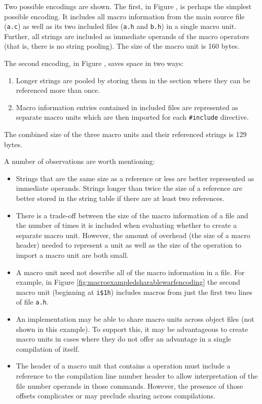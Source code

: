 Two possible encodings are shown. The first, in 
Figure , is perhaps the simplest
possible encoding. It includes all macro information from the
main source file (\texttt{a.c}) as well as its two included files
(\texttt{a.h} and \texttt{b.h}) in a single macro unit. Further,
all strings are included as immediate operands of the macro
operators (that is, there is no string pooling). The size
of the macro unit is 160 bytes.

The second encoding, in 
Figure ,
saves space in two ways:
\begin{enumerate}[1. ]
\item Longer strings are pooled by storing them in the
\dotdebugstr{} section where they can be referenced more than
once.

\item Macro information entries contained in included files
are represented as separate macro units which are then
imported for each \texttt{\#include} directive.

\end{enumerate}
The combined size of the three macro units and their referenced
strings is 129 bytes.

A number of observations are worth mentioning:
\begin{itemize}
\item
Strings that are the same size as a reference or less are
better represented as immediate operands. Strings longer
than twice the size of a reference are better stored in the
string table if there are at least two references.

\item
There is a trade-off between the size of the macro information
of a file and the number of times it is included when evaluating
whether to create a separate macro unit. However, the amount
of overhead (the size of a macro header) needed to represent a
unit as well as the size of the operation to import a macro unit
are both small.

\item
A macro unit need not describe all of the macro information in
a file. For example, in Figure \ref{fig:macroexampledsharablewarfencoding}
the second macro unit (beginning at \texttt{i\$1h}) includes macros
from just the first two lines of file \texttt{a.h}.

\item
An implementation may be able to share macro units across object
files (not shown in this example). To support this, it may be
advantageous to create macro units in cases where they do not
offer an advantage in a single compilation of itself.

\item
The header of a macro unit that contains a \DWMACROstartfile{}
operation must include a reference to the compilation line number 
header to allow interpretation of the file number operands in
those commands. However, the presence of those offsets complicates
or may preclude sharing across compilations.

\end{itemize}


